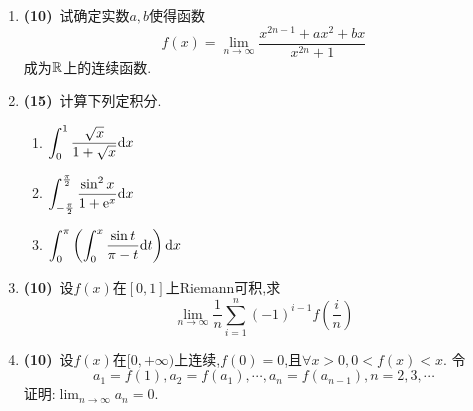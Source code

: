 \documentclass{ctexart}
\begin{document}
\begin{enumerate}[leftmargin=*,label=\textbf{\arabic*.},topsep=0pt,parsep=0pt,itemsep=0pt,partopsep=0pt]
    \item \textbf{(10)}\ 试确定实数$a,b$使得函数$$f(x)=\lim_{n\to\infty}{\dfrac{x^{2n-1}+ax^2+bx}{x^{2n}+1}}$$成为$\mathbb{R}$上的连续函数.

    \item \textbf{(15)}\ 计算下列定积分.
    \begin{enumerate}[label=\textbf{(\arabic*)}]
        \item $\displaystyle\int_0^1\dfrac{\sqrt{x}}{1+\sqrt{x}}\mathrm{d} x$
        \item $\displaystyle\int_{-\frac{\pi}{2}}^{\frac{\pi}{2}}\dfrac{\sin^2x}{1+\mathrm{e}^x}\mathrm{d} x$
        \item $\displaystyle\int_{0}^{\pi}\left(\int_{0}^{x}\dfrac{\sin t}{\pi-t}\mathrm{d} t\right)\mathrm{d} x$
    \end{enumerate}

    \item \textbf{(10)}\ 设$f(x)$在$[0,1]$上Riemann可积,求$$\lim_{n\to\infty}\dfrac{1}{n}\sum_{i=1}^{n}(-1)^{i-1}f\left(\dfrac{i}{n}\right)$$

    \item \textbf{(10)}\ 设$f(x)$在$[0,+\infty)$上连续,$f(0)=0$,且$\forall x>0,0<f(x)<x$.
    令$$a_1=f(1),a_2=f(a_1),\cdots,a_n=f(a_{n-1}),n=2,3,\cdots$$
    证明:$\displaystyle\lim_{n\to\infty}a_n=0$.
\end{enumerate}
\end{document}
